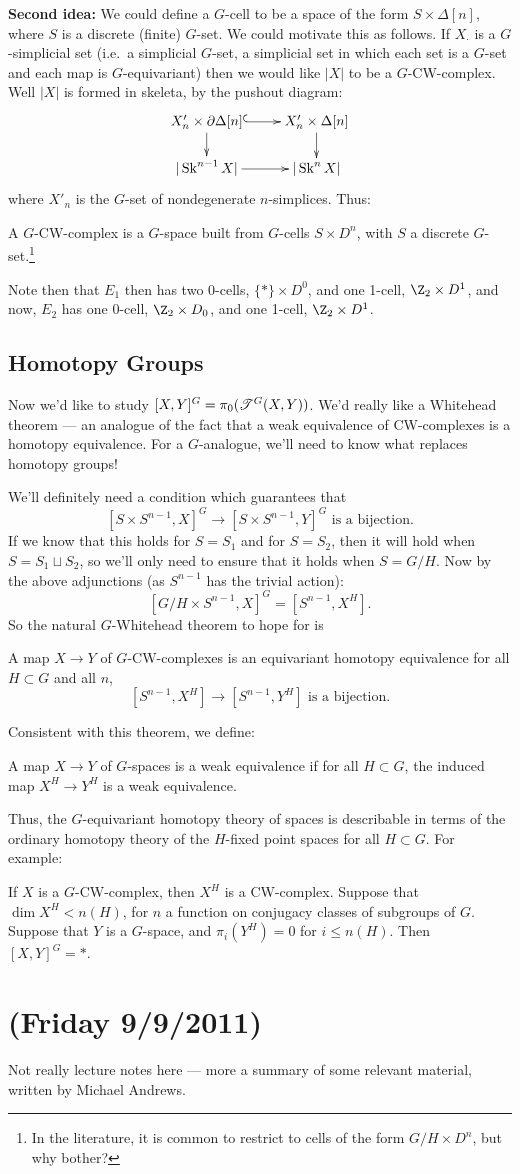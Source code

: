 \documentclass[11pt]{article}
\newcommand{\NewLecture}[3]{\section{#1 {\small(#2/#3/2011)}}}
\begin{document}
\begin{SecondWeek}
\noindent \textbf{Second idea:} We could define a $G$-cell to be a space of the form $S\times \Delta[n]$, where $S$ is a discrete (finite) $G$-set. We could motivate this as follows. If $X_\cdot$ is a $G$-simplicial set (i.e.\ a simplicial $G$-set, a simplicial set in which each set is a $G$-set and each map is $G$-equivariant) then we would like $|X|$ to be a $G$-CW-complex. Well $|X|$ is formed in skeleta, by the pushout diagram:
\[\xymatrix@R=.6cm{
\ar[d]X'_n\times\partial\Delta[n]\ar@{^{(}->}[r]&X'_n\times\Delta[n]\ar[d]\\
|\Skel^{n-1}X|\ar[r]&|\Skel^nX|
}\]
where $X'_n$ is the $G$-set of nondegenerate $n$-simplices. Thus:
\begin{defn*}
A $G$-CW-complex is a $G$-space built from $G$-cells $S\times D^n$, with $S$ a discrete  $G$-set.\footnote{In the literature, it is common to restrict to cells of the form $G/H\times D^n$, but why bother?}
\end{defn*}
Note then that $E_1$ then has two $0$-cells, $\{*\}\times D^0$, and one 1-cell, $\Z_2\times D^1$, and now, $E_2$ has one $0$-cell, $\Z_2\times D_0$, and one 1-cell, $\Z_2\times D^1$.
\subsection*{Homotopy Groups}
Now we'd like to study $[X,Y]^G=\pi_0(\mathscr{T}^G(X,Y))$.  We'd really like a Whitehead theorem --- an analogue of the fact that a weak equivalence of CW-complexes is a homotopy equivalence. For a $G$-analogue, we'll need to know what replaces homotopy groups!

We'll definitely need a condition which guarantees that
\[[S\times S^{n-1},X]^G\to[S\times S^{n-1},Y]^G\text{\ \ is a bijection.}\]
If we know that this holds for $S=S_1$ and for $S=S_2$, then it will hold when $S=S_1\sqcup S_2$, so we'll only need to ensure that it holds when $S=G/H$. Now by the above adjunctions (as $S^{n-1}$ has the trivial action):
\[[G/H\times S^{n-1},X]^G=[S^{n-1},X^H].\]
So the natural $G$-Whitehead theorem to hope for is
\begin{thm*}
A map $X\to Y$ of $G$-CW-complexes is an equivariant homotopy equivalence \Iff for all $H\subset G$ and all $n$,
\[[S^{n-1},X^H]\to[S^{n-1},Y^H]\text{\ \ is a bijection}.\]
\end{thm*}
\noindent Consistent with this theorem, we define:
\begin{defn*}
A map $X\to Y$ of $G$-spaces is a weak equivalence if for all $H\subset G$, the induced map $X^H\to Y^H$ is a weak equivalence.
\end{defn*}
\noindent
Thus, the $G$-equivariant homotopy theory of spaces is describable in terms of the ordinary homotopy theory of the $H$-fixed point spaces for all $H\subset G$.  For example:
\begin{thm*}
If $X$ is a $G$-CW-complex, then $X^H$ is a CW-complex. Suppose that $\dim X^H<n(H)$, for $n$ a function on conjugacy classes of subgroups of $G$. Suppose that $Y$ is a $G$-space, and $\pi_i(Y^H)=0$ for $i\leq n(H)$. Then $[X,Y]^G=*$.
\end{thm*}
\NewLecture{}{Friday 9}{9}
Not really lecture notes here --- more a summary of some relevant material, written by Michael Andrews.

\end{SecondWeek}
\end{document}

